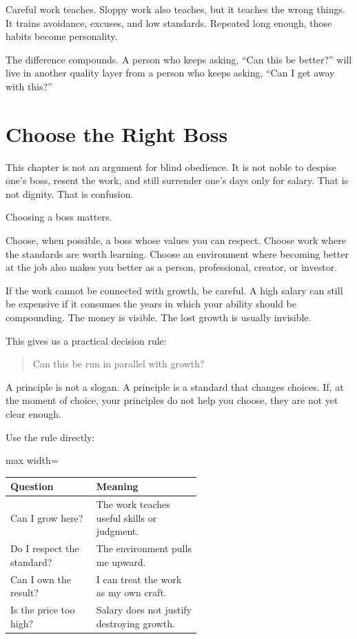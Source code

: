 Careful work teaches. Sloppy work also teaches, but it teaches the wrong things. It trains avoidance, excuses, and low standards. Repeated long enough, those habits become personality.

The difference compounds. A person who keeps asking, ``Can this be better?'' will live in another quality layer from a person who keeps asking, ``Can I get away with this?''

\section*{Choose the Right Boss}

This chapter is not an argument for blind obedience. It is not noble to despise one's boss, resent the work, and still surrender one's days only for salary. That is not dignity. That is confusion.

Choosing a boss matters.

Choose, when possible, a boss whose values you can respect. Choose work where the standards are worth learning. Choose an environment where becoming better at the job also makes you better as a person, professional, creator, or investor.

If the work cannot be connected with growth, be careful. A high salary can still be expensive if it consumes the years in which your ability should be compounding. The money is visible. The lost growth is usually invisible.

This gives us a practical decision rule:

\begin{quote}
Can this be run in parallel with growth?
\end{quote}

A principle is not a slogan. A principle is a standard that changes choices. If, at the moment of choice, your principles do not help you choose, they are not yet clear enough.

Use the rule directly:

\begin{center}
\begin{adjustbox}{max width=\linewidth}
\begin{tabular}{lp{0.55\linewidth}}
\hline
Question & Meaning \\
\hline
Can I grow here? & The work teaches useful skills or judgment. \\
Do I respect the standard? & The environment pulls me upward. \\
Can I own the result? & I can treat the work as my own craft. \\
Is the price too high? & Salary does not justify destroying growth. \\
\hline
\end{tabular}
\end{adjustbox}
\end{center}

